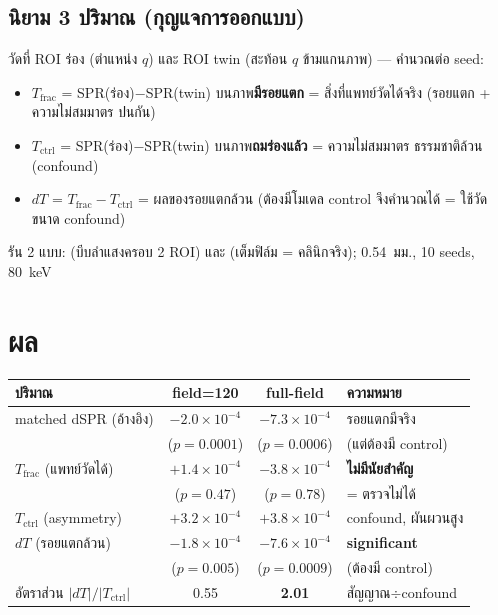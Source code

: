 \documentclass[16pt]{extarticle}
\newcommand{\code}[1]{{\ttfamily\detokenize{#1}}}
\newcommand{\thd}[1]{\cellcolor{theme}\color{white}\textbf{#1}}
\begin{document}
\subsection{นิยาม 3 ปริมาณ (กุญแจการออกแบบ)}
วัดที่ ROI ร่อง (ตำแหน่ง $q$) และ ROI twin (สะท้อน $q$ ข้ามแกนภาพ) --- คำนวณต่อ seed:
\begin{itemize}
  \item \textbf{$T_{\text{frac}}$} = SPR(ร่อง)$-$SPR(twin) บนภาพ\textbf{มีรอยแตก} = \textcolor{bad}{สิ่งที่แพทย์วัดได้จริง}
        (รอยแตก + ความไม่สมมาตร ปนกัน)
  \item \textbf{$T_{\text{ctrl}}$} = SPR(ร่อง)$-$SPR(twin) บนภาพ\textbf{ถมร่องแล้ว} = \textcolor{warn}{ความไม่สมมาตร
        ธรรมชาติล้วน (confound)}
  \item \textbf{$dT$} = $T_{\text{frac}}-T_{\text{ctrl}}$ = \textcolor{theme}{ผลของรอยแตกล้วน} (ต้องมีโมเดล control
        จึงคำนวณได้ = ใช้วัดขนาด confound)
\end{itemize}
รัน 2 แบบ: \code{field_mm=120} (บีบลำแสงครอบ 2 ROI) และ \code{field_mm=0} (เต็มฟิล์ม = คลินิกจริง);
0.54~มม., 10 seeds, 80~keV

\section{ผล}
\begin{table}[h]\centering\small\renewcommand{\arraystretch}{1.25}
\begin{tabular}{l c c l}
\thd{ปริมาณ} & \thd{field=120} & \thd{full-field} & \thd{ความหมาย} \\
\midrule
matched dSPR (อ้างอิง) & $-2.0\!\times\!10^{-4}$ & $-7.3\!\times\!10^{-4}$ & รอยแตกมีจริง \\
 & ($p=0.0001$) & ($p=0.0006$) & (แต่ต้องมี control) \\
\rowcolor{softgray}
\textcolor{bad}{$T_{\text{frac}}$ (แพทย์วัดได้)} & $+1.4\!\times\!10^{-4}$ & $-3.8\!\times\!10^{-4}$ & \textcolor{bad}{\textbf{ไม่มีนัยสำคัญ}} \\
\rowcolor{softgray}
 & ($p=0.47$) & ($p=0.78$) & = ตรวจไม่ได้ \\
\textcolor{warn}{$T_{\text{ctrl}}$ (asymmetry)} & $+3.2\!\times\!10^{-4}$ & $+3.8\!\times\!10^{-4}$ & confound, ผันผวนสูง \\
\rowcolor{softgray}
\textcolor{theme}{$dT$ (รอยแตกล้วน)} & $-1.8\!\times\!10^{-4}$ & $-7.6\!\times\!10^{-4}$ & \textbf{significant} \\
\rowcolor{softgray}
 & ($p=0.005$) & ($p=0.0009$) & (ต้องมี control) \\
อัตราส่วน $|dT|/|T_{\text{ctrl}}|$ & 0.55 & \textbf{2.01} & สัญญาณ$\div$confound \\
\bottomrule
\end{tabular}
\end{table}
\end{document}
